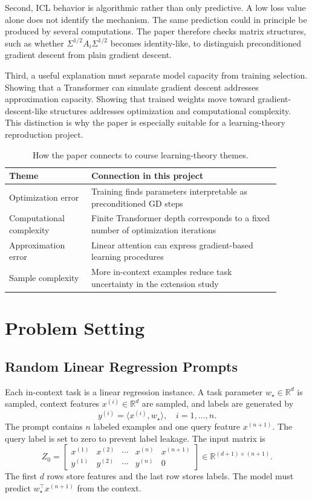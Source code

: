 \documentclass[conference]{IEEEtran}
\newcommand{\R}{\mathbb{R}}
\newcommand{\wstar}{w_\star}
\begin{document}
Second, ICL behavior is algorithmic rather than only predictive. A low loss value alone does not identify the mechanism. The same prediction could in principle be produced by several computations. The paper therefore checks matrix structures, such as whether $\Sigma^{1/2}A_i\Sigma^{1/2}$ becomes identity-like, to distinguish preconditioned gradient descent from plain gradient descent.

Third, a useful explanation must separate model capacity from training selection. Showing that a Transformer can simulate gradient descent addresses approximation capacity. Showing that trained weights move toward gradient-descent-like structures addresses optimization and computational complexity. This distinction is why the paper is especially suitable for a learning-theory reproduction project.

\begin{table}[!t]
\centering
\caption{How the paper connects to course learning-theory themes.}
\label{tab:course_fit}
\begin{tabular}{p{0.27\linewidth}p{0.62\linewidth}}
\toprule
Theme & Connection in this project\\
\midrule
Optimization error & Training finds parameters interpretable as preconditioned GD steps\\
Computational complexity & Finite Transformer depth corresponds to a fixed number of optimization iterations\\
Approximation error & Linear attention can express gradient-based learning procedures\\
Sample complexity & More in-context examples reduce task uncertainty in the extension study\\
\bottomrule
\end{tabular}
\end{table}

\section{Problem Setting}
\subsection{Random Linear Regression Prompts}
Each in-context task is a linear regression instance. A task parameter $\wstar \in \R^d$ is sampled, context features $x^{(i)} \in \R^d$ are sampled, and labels are generated by
\begin{equation}
y^{(i)} = \langle x^{(i)}, \wstar \rangle,\quad i = 1,\ldots,n.
\end{equation}
The prompt contains $n$ labeled examples and one query feature $x^{(n+1)}$. The query label is set to zero to prevent label leakage. The input matrix is
\begin{equation}
Z_0 =
\begin{bmatrix}
x^{(1)} & x^{(2)} & \cdots & x^{(n)} & x^{(n+1)}\\
y^{(1)} & y^{(2)} & \cdots & y^{(n)} & 0
\end{bmatrix}
\in \R^{(d+1)\times(n+1)}.
\end{equation}
The first $d$ rows store features and the last row stores labels. The model must predict $\wstar^\top x^{(n+1)}$ from the context.
\end{document}
